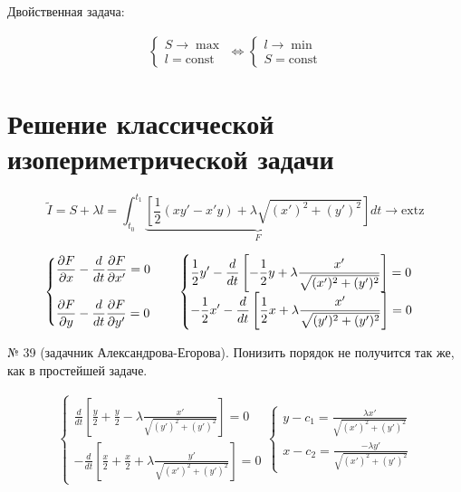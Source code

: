 \documentclass[12pt, a4paper]{report}
\begin{document}
Двойственная  задача: 

\[ \begin{aligned}
\begin{cases}
S \to  \max  \\
l = \mathrm{const}
\end{cases}
\Leftrightarrow 
\begin{cases}
l \to  \min  \\
S = \mathrm{const}
\end{cases}
\end{aligned} \]

\section{Решение классической изопериметрической задачи}

\[ \tilde{I } = S + \lambda l = \int_{t_0 }^{t_1 } \underbrace{\left[ \frac{1}{2 } (x y ' - x' y )+ \lambda \sqrt{(x') ^2 + (y ' ) ^2 } \right]}_{F}dt \to  \mathrm{extz}  \] 

\[ \begin{aligned}
    \begin{cases}
        \displaystyle \frac{\partial F }{\partial x } - \frac{d}{dt } \frac{\partial  F }{\partial  x ' } = 0 \quad  \\ 
        \vspace{0.01 mm} \\
        \displaystyle \frac{\partial F }{\partial y } - \frac{d}{dt } \frac{\partial  F }{\partial  y ' } = 0 \quad 
    \end{cases}
    \begin{cases}
        \displaystyle  \frac{1}{2 } y ' - \frac{d}{dt } \left[ -\frac{1}{2 } y + \lambda \frac{x ' }{\sqrt{(x') ^2 + (y ' ) ^2 }}  \right] =0\\
        \displaystyle -\frac{1}{2 } x ' - \frac{d}{dt } \left[ \frac{1}{2 } x + \lambda \frac{x ' }{\sqrt{(y') ^2 + (y ' ) ^2 }}  \right] =0 
    \end{cases}
\end{aligned}
\] 

№ 39 (задачник Александрова-Егорова).  Понизить порядок не получится так же, как в простейшей задаче.

\[ \begin{aligned}
    \begin{cases}
        \displaystyle \frac{d}{dt } \left[ \frac{y}{2 } + \frac{y}{2 } - \lambda \frac{x' }{\sqrt{(y') ^2 + (y ' ) ^2 }}  \right] =0 \\
        \displaystyle -\frac{d}{dt } \left[ \frac{x}{2 } + \frac{x}{2 } + \lambda \frac{y' }{\sqrt{(x') ^2 + (y ' ) ^2 }}  \right] =0
    \end{cases} 
    \begin{cases}
    \displaystyle y - c_1 = \frac{\lambda x' }{\sqrt{(x') ^2 + (y ' ) ^2 }} \\
    \displaystyle x - c_2 = \frac{-\lambda y' }{\sqrt{(x') ^2 + (y ' ) ^2 }}
    \end{cases}
\end{aligned}\] 
\end{document}
